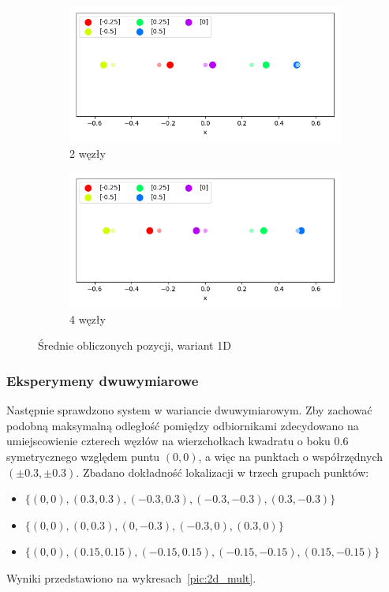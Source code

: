 \begin{figure}[H]
\centering
\begin{subfigure}{.5\textwidth}
    \centering
    \includegraphics[width=\linewidth]{pics/mult_lat_1d/positions_2_mean.png}
\caption{2 węzły}
\label{pic:1d_2_mult}
\end{subfigure}%
\begin{subfigure}{.5\textwidth}
    \centering
    \includegraphics[width=\linewidth]{pics/mult_lat_1d/positions_4_mean.png}
\caption{4 węzły}
\label{pic:1d_4_mult}
\end{subfigure}
\caption{Średnie obliczonych pozycji, wariant 1D}
\label{pic:1d_mult}
\end{figure}

\subsubsection{Eksperymeny dwuwymiarowe}

Następnie sprawdzono system w wariancie dwuwymiarowym. Zby zachować podobną maksymalną odległość pomiędzy odbiornikami zdecydowano na umiejscowienie czterech węzłów na wierzchołkach kwadratu o boku $0.6$ symetrycznego względem puntu $(0,0)$, a więc na punktach o współrzędnych $(\pm0.3, \pm0.3)$. Zbadano dokładność lokalizacji w trzech grupach punktów:
\begin{itemize}
    \item $\{(0,0), (0.3,0.3), (-0.3,0.3), (-0.3,-0.3), (0.3,-0.3)\}$
    \item $\{(0,0), (0,0.3), (0,-0.3), (-0.3,0), (0.3,0)\}$
    \item $\{(0,0), (0.15,0.15), (-0.15,0.15), (-0.15,-0.15), (0.15,-0.15)\}$
\end{itemize}
Wyniki przedstawiono na wykresach~\ref{pic:2d_mult}.

